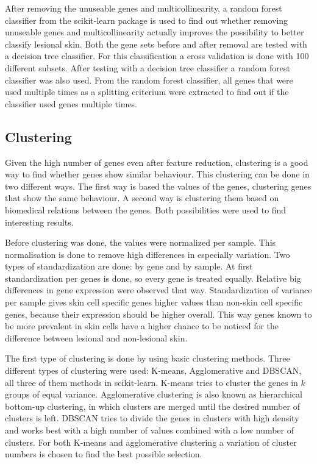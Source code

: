 \documentclass[10pt,a4paper]{article}
\begin{document}
	After removing the unuseable genes and multicollinearity, a random forest classifier from the scikit-learn package is used to find out whether removing unuseable genes and multicollinearity actually improves the possibility to better classify lesional skin. Both the gene sets before and after removal are tested with a decision tree classifier. For this classification a cross validation is done with 100 different subsets. After testing with a decision tree classifier a random forest classifier was also used. From the random forest classifier, all genes that were used multiple times as a splitting criterium were extracted to find out if the classifier used genes multiple times.
	
	\subsection{Clustering}
	\label{subsec:MethodsPositionalClustering}
	
	Given the high number of genes even after feature reduction, clustering is a good way to find whether genes show similar behaviour. This clustering can be done in two different ways. The first way is based the values of the genes, clustering genes that show the same behaviour. A second way is clustering them based on biomedical relations between the genes. Both possibilities were used to find interesting results.
	
	Before clustering was done, the values were normalized per sample. This normalisation is done to remove high differences in especially variation. Two types of standardization are done: by gene and by sample. At first standardization per genes is done, so every gene is treated equally. Relative big differences in gene expression were observed that way. Standardization of variance per sample gives skin cell specific genes higher values than non-skin cell specific genes, because their expression should be higher overall. This way genes known to be more prevalent in skin cells have a higher chance to be noticed for the difference between lesional and non-lesional skin.
	
	The first type of clustering is done by using basic clustering methods. Three different types of clustering were used: K-means, Agglomerative and DBSCAN, all three of them methods in scikit-learn. K-means tries to cluster the genes in $k$ groups of equal variance. Agglomerative clustering is also known as hierarchical bottom-up clustering, in which clusters are merged until the desired number of clusters is left. DBSCAN tries to divide the genes in clusters with high density and works best with a high number of values combined with a low number of clusters. For both K-means and agglomerative clustering a variation of cluster numbers is chosen to find the best possible selection. 
	
\end{document}
